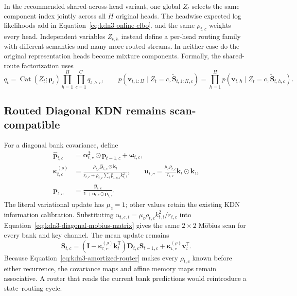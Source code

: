 \documentclass[11pt]{article}
\newcommand{\ve}[1]{\boldsymbol{#1}}
\newcommand{\tr}{\mathsf{T}}
\newcommand{\Cat}{\operatorname{Cat}}
\begin{document}
In the recommended shared-across-head variant, one global $Z_t$ selects the same component index
jointly across all $H$ original heads.  The headwise expected log likelihoods add in
Equation~\eqref{eq:kdn3-online-elbo}, and the same $\rho_{t,c}$ weights every head.  Independent
variables $Z_{t,h}$ instead define a per-head routing family with different semantics and many more
routed streams.  In neither case do the original representation heads become mixture components.
Formally, the shared-route factorization uses
\begin{equation}
  q_t=\Cat(Z_t;\ve{\rho}_t)
      \prod_{h=1}^{H}\prod_{c=1}^{C}q_{t,h,c},
  \qquad
  p(\ve{v}_{t,1:H}\mid Z_t=c,\widetilde{\ve{S}}_{t,1:H,c})
  =\prod_{h=1}^{H}p(\ve{v}_{t,h}\mid Z_t=c,\widetilde{\ve{S}}_{t,h,c}).
  \label{eq:kdn3-shared-head-route}
\end{equation}

\subsection{Routed Diagonal KDN remains scan-compatible}

For a diagonal bank covariance, define
\begin{equation}
\begin{aligned}
  \widehat{\ve{p}}_{t,c}
  &=\ve{\alpha}_{t,c}^{2}\odot\ve{p}_{t-1,c}
    +\ve{\omega}_{t,c},
  \\
  \ve{\kappa}_{t,c}^{(\rho)}
  &=
  \frac{
    \rho_{t,c}\widehat{\ve{p}}_{t,c}\odot\ve{k}_t
  }{
    r_{t,c}
    +\rho_{t,c}\sum_i\widehat p_{t,c,i}k_{t,i}^{2}
  },
  \qquad
  \ve{u}_{t,c}
  =\frac{\mu_c\rho_{t,c}}{r_{t,c}}
   \ve{k}_t\odot\ve{k}_t,
  \\
  \ve{p}_{t,c}
  &=\frac{
    \widehat{\ve{p}}_{t,c}
  }{
    \ve{1}+\ve{u}_{t,c}\odot\widehat{\ve{p}}_{t,c}
  }.
\end{aligned}
  \label{eq:kdn3-routed-diagonal-update}
\end{equation}
The literal variational update has $\mu_c=1$; other values retain the existing KDN information
calibration.  Substituting
$u_{t,c,i}=\mu_c\rho_{t,c}k_{t,i}^2/r_{t,c}$ into
Equation~\eqref{eq:kdn3-diagonal-mobius-matrix} gives the same $2\times2$ M\"obius scan for every
bank and key channel.  The mean update remains
\begin{equation}
  \ve{S}_{t,c}
  =
  (\ve{I}-\ve{\kappa}_{t,c}^{(\rho)}\ve{k}_t^{\tr})
  \ve{D}_{t,c}\ve{S}_{t-1,c}
  +\ve{\kappa}_{t,c}^{(\rho)}\ve{v}_t^{\tr}.
  \label{eq:kdn3-routed-memory-update}
\end{equation}
Because Equation~\eqref{eq:kdn3-amortized-router} makes every $\rho_{t,c}$ known before either
recurrence, the covariance maps and affine memory maps remain associative.  A router that reads
the current bank predictions would reintroduce a state--routing cycle.
\end{document}
